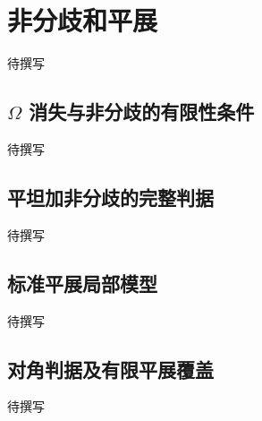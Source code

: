 
% 
% 

\section{非分歧和平展}
\label{g5:sec:1503}

待撰写

\subsection{\texorpdfstring{\(\Omega\) 消失与非分歧的有限性条件}{\GeometryPdfOmega{} 消失与非分歧的有限性条件}}
\label{g5:subsec:1503:01}
待撰写

\subsection{平坦加非分歧的完整判据}
\label{g5:subsec:1503:02}
待撰写

\subsection{标准平展局部模型}
\label{g5:subsec:1503:03}
待撰写

\subsection{对角判据及有限平展覆盖}
\label{g5:subsec:1503:04}
待撰写
